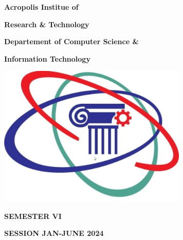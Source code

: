 \documentclass[12pt,,a4paper]{article}
\begin{document}
\thispagestyle{empty}
\vspace*{-3cm}

\begin{center}
\textbf{\fontsize{22}{\baselineskip}\selectfont Acropolis Institue of }

\bigskip

\textbf{\fontsize{22}{\baselineskip}\selectfont Research \& Technology}

\bigskip

\textbf{\fontsize{14}{\baselineskip}\selectfont Departement of Computer Science \& }

\bigskip

\textbf{\fontsize{14}{\baselineskip}\selectfont Information Technology }

\bigskip


\bigskip

\includegraphics[width=9cm]{logo-3.png}
\vspace*{1cm}
\bigskip

\textbf{\fontsize{20}{\baselineskip}\selectfont SEMESTER VI}

\bigskip

\textbf{\fontsize{20}{\baselineskip}\selectfont SESSION JAN-JUNE 2024}

\bigskip

\bigskip

\bigskip


\bigskip


\end{center}

\bigskip


\bigskip

\end{document}
